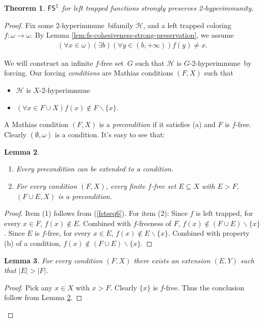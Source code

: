 \documentclass{amsart}
\newtheorem{theorem}{Theorem}[section]
\newtheorem{lemma}[theorem]{Lemma}
\theoremstyle{definition}
\theoremstyle{remark}
\numberwithin{equation}{section}
\theoremstyle{noparens}
\def\propertyL{2-hyperimmunity}
\def\hyper{2-hyperimmune}
\newcommand{\Hcal}{\mathcal{H}}
\renewcommand{\setminus}{\smallsetminus}
\newcommand{\s}[1]{\ensuremath{\sf{#1}}}
\DeclareMathOperator{\fs}{\s{FS}}
\begin{document}
\begin{theorem}\label{thm:strong-preservation-fs1-left-trapped}
$\fs^1$ for left trapped functions strongly preserves \propertyL.
\end{theorem}
\begin{proof}
Fix some  \hyper\ bifamily $\Hcal$,
and a left trapped coloring~$f : \omega \to \omega$.
By Lemma \ref{lem:fs-cohesiveness-strong-preservation},
we assume
\begin{align}\label{fstseq6}
(\forall x \in\omega)
  (\exists b)(\forall y \in  (b, +\infty))f(y) \neq x.
  \end{align}

We will construct an infinite $f$-free set~$G$ such that $\Hcal$ is $G  $-\hyper\ by forcing.
Our forcing \emph{conditions} are Mathias conditions $(F, X)$ such that
\begin{itemize}
  \item[(a)] $\Hcal$ is $X $-\hyper
  \item[(b)] $(\forall x \in F \cup X) f(x) \not \in F \setminus \{x\}$.
\end{itemize}
A Mathias condition $(F,X)$ is a \emph{precondition} if
it satisfies (a) and $F$ is $f$-free.
Clearly  $(\emptyset, \omega)$ is a condition.
 It's easy to see that:
 \begin{lemma}\label{lem:fs1-extension}
 \
 \begin{enumerate}
 \item Every precondition can be extended to a condition.
 \item For every condition  $(F,X)$, every finite $f$-free set $E\subseteq X$ with $E>F$,
 $(F\cup E, X)$ is a precondition.

 \end{enumerate}

 \end{lemma}
\begin{proof}
Item (1) follows from (\ref{fstseq6}).
For item (2): Since $f$ is left trapped,
for every $x\in F$, $f(x)\notin E$.
Combined with $f$-freeness of $F$,  $f(x)\notin (F\cup E)\setminus \{x\}$.
Since $E$ is $f$-free, for every $x\in E$,
$f(x)\notin E\setminus\{x\}$.
Combined with  property (b) of a condition,
$f(x)\notin (F\cup E)\setminus \{x\}$.

\end{proof}
\begin{lemma}\label{lem:fs1-left-trapped-preserves-1}
For every condition $(F, X)$ there exists an extension
$(E, Y)$ such that $|E| > |F|$.
\end{lemma}
\begin{proof}
Pick any $x \in X$ with $x>F$.
Clearly $\{x\}$ is $f$-free.
Thus the conclusion follow from Lemma
 \ref{lem:fs1-extension}.
\end{proof}





\end{proof}
\end{document}
